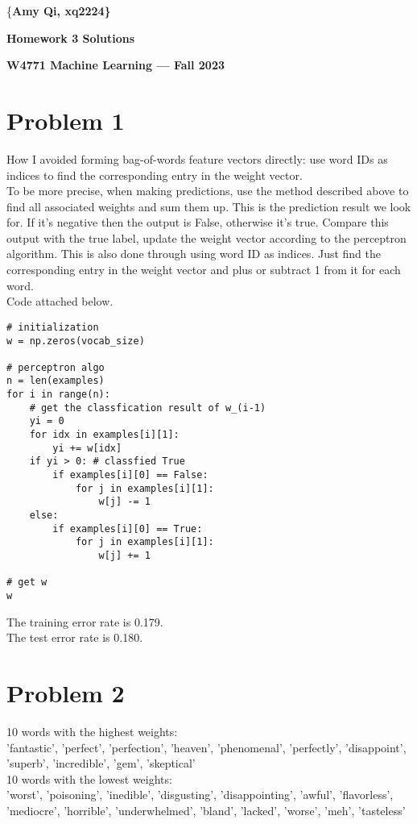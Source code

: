 \documentclass[11pt]{article}
\begin{document}
\centerline{\{\bf Amy Qi, xq2224\}}
\centerline{\bf Homework 3 Solutions}
\centerline{\bf W4771 Machine Learning --- Fall 2023}

\bigskip 
\bigskip

\section*{Problem 1}
How I avoided forming bag-of-words feature vectors directly: use word IDs as indices to find the corresponding entry in the weight vector. \\
To be more precise, when making predictions, use the method described above to find all associated weights and sum them up. This is the prediction result we look for. If it's negative then the output is False, otherwise it's true. Compare this output with the true label, update the weight vector according to the perceptron algorithm. This is also done through using word ID as indices. Just find the corresponding entry in the weight vector and plus or subtract 1 from it for each word. \\
Code attached below.

\begin{verbatim}
# initialization
w = np.zeros(vocab_size)

# perceptron algo
n = len(examples)
for i in range(n):
    # get the classfication result of w_(i-1)
    yi = 0
    for idx in examples[i][1]:
        yi += w[idx]
    if yi > 0: # classfied True
        if examples[i][0] == False:
            for j in examples[i][1]:
                w[j] -= 1
    else:
        if examples[i][0] == True:
            for j in examples[i][1]:
                w[j] += 1

# get w
w
\end{verbatim}

The training error rate is 0.179. \\
The test error rate is 0.180.

\newpage
\section*{Problem 2}
10 words with the highest weights: \\
'fantastic', 'perfect', 'perfection', 'heaven', 'phenomenal', 'perfectly', 'disappoint', 'superb', 'incredible', 'gem', 'skeptical' \\

10 words with the lowest weights:\\
'worst', 'poisoning', 'inedible', 'disgusting', 'disappointing', 'awful', 'flavorless', 'mediocre', 'horrible', 'underwhelmed', 'bland', 'lacked', 'worse', 'meh', 'tasteless'
\end{document}
